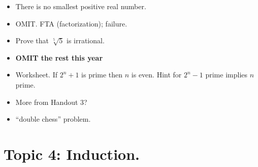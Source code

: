\documentclass[12pt]{article}
\begin{document}
\begin{itemize}
\item There is no smallest positive real number.
\item OMIT. FTA (factorization); failure.
\item Prove that $\sqrt[5]{5}$ is irrational.
\item \textbf{OMIT the rest this year}
\item Worksheet. If $2^n+1$ is prime then $n$ is even. Hint for $2^n-1$ prime implies  $n$ prime.
\item More from Handout 3?
\item ``double chess'' problem. 

\end{itemize}





\newpage
\section[4 (\csname dateWeek4\endcsname): Induction.]{Topic  4: Induction.}
\end{document}
